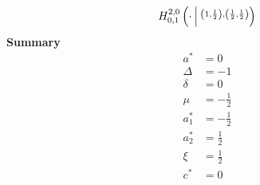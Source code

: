 \documentclass{article}
\newcommand{\FoxH}[5]{H_{#2}^{#1}\left(#3\:\middle\vert\: \begin{subarray}{l}#4\\[0.4em] #5\end{subarray}\right)}
\begin{document}
\begin{align*}
\FoxH{2,0}{0,1}{\cdot}{\left(1, \frac{1}{2}\right), \left(\frac{1}{2}, \frac{1}{2}\right)}{}
\end{align*}
\noindent\textbf{Summary}
\begin{align*}
a^* &= 0 \\
\Delta &= -1 \\
\delta &= 0 \\
\mu &= -\frac{1}{2} \\
a_1^* &= -\frac{1}{2} \\
a_2^* &= \frac{1}{2} \\
\xi &= \frac{1}{2} \\
c^* &= 0 \\
\end{align*}
\end{document}
